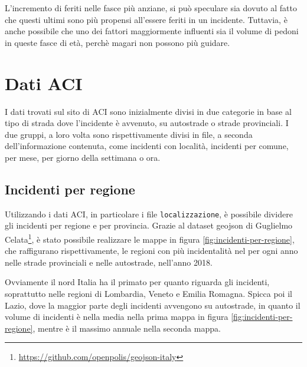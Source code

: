 \documentclass[a4paper]{report}
\newcommand{\columnstyle}[1]{\texttt{#1}}
\begin{document}
L'incremento di feriti nelle fasce più anziane, si può speculare sia dovuto al fatto che 
questi ultimi sono più propensi all'essere feriti in un incidente. 
Tuttavia, è anche possibile che uno dei fattori maggiormente influenti sia il 
volume di pedoni in queste fasce di età, perchè magari non possono più guidare.

\section{Dati ACI}

I dati trovati sul sito di ACI sono inizialmente divisi in due categorie in 
base al tipo di strada dove l'incidente è avvenuto, su autostrade o strade provinciali.
I due gruppi, a loro volta sono rispettivamente divisi in file, a seconda dell'informazione 
contenuta, come incidenti con località, incidenti per comune, per mese, 
per giorno della settimana o ora.

\subsection{Incidenti per regione}

Utilizzando i dati ACI, in particolare i file \columnstyle{localizzazione}, è 
possibile dividere gli incidenti per regione e per provincia.
Grazie al dataset geojson di Guglielmo 
Celata\footnote{\url{https://github.com/openpolis/geojson-italy}}, 
è stato possibile realizzare le mappe in figura \ref{fig:incidenti-per-regione}, 
che raffigurano rispettivamente, le regioni con più incidentalità nel per ogni anno nelle 
strade provinciali e nelle autostrade, nell'anno 2018.

Ovviamente il nord Italia ha il primato per quanto riguarda gli incidenti, soprattutto nelle 
regioni di Lombardia, Veneto e Emilia Romagna. 
Spicca poi il Lazio, dove la maggior parte degli incidenti avvengono su autostrade, 
in quanto il volume di incidenti è nella media nella prima mappa in figura 
\ref{fig:incidenti-per-regione}, mentre è il massimo annuale nella seconda mappa.
\end{document}
